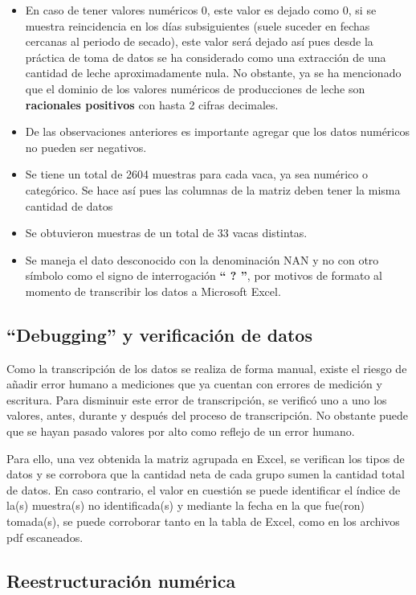\begin{itemize}
    \item En caso de tener valores numéricos 0, este valor es dejado como 0, si se muestra reincidencia en los días subsiguientes (suele suceder en fechas cercanas al periodo de secado), este valor será dejado así pues desde la práctica de toma de datos se ha considerado como una extracción de una cantidad de leche aproximadamente nula. No obstante, ya se ha mencionado que el dominio de los valores numéricos de producciones de leche son \textbf{racionales positivos} con hasta 2 cifras decimales.
    \item De las observaciones anteriores es importante agregar que los datos numéricos no pueden ser negativos.
    \item Se tiene un total de 2604 muestras para cada vaca, ya sea numérico o categórico. Se hace así pues las columnas de la matriz deben tener la misma cantidad de datos
    \item Se obtuvieron muestras de un total de 33 vacas distintas.
    \item Se maneja el dato desconocido con la denominación NAN y no con otro símbolo como el signo de interrogación \textbf{`` ? ''}, por motivos de formato al momento de transcribir los datos a Microsoft Excel.
\end{itemize}

\subsection{``Debugging'' y verificación de datos}

Como la transcripción de los datos se realiza de forma manual, existe el riesgo de añadir error humano a mediciones que ya cuentan con errores de medición y escritura. Para disminuir este error de transcripción, se verificó uno a uno los valores, antes, durante y después del proceso de transcripción. No obstante puede que se hayan pasado valores por alto como reflejo de un error humano.

Para ello, una vez obtenida la matriz agrupada en Excel, se verifican los tipos de datos y se corrobora que la cantidad neta de cada grupo sumen la cantidad total de datos. En caso contrario, el valor en cuestión se puede identificar el índice de la(s) muestra(s) no identificada(s) y mediante la fecha en la que fue(ron)  tomada(s), se puede corroborar tanto en la tabla de Excel, como en los archivos pdf escaneados.

\subsection{Reestructuración numérica}

